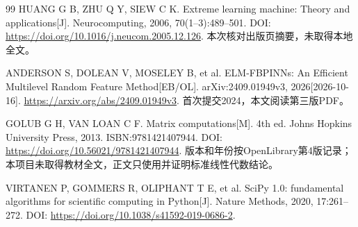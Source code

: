 \begin{thebibliography}{99}
 HUANG G B, ZHU Q Y, SIEW C K. Extreme learning machine: Theory and applications[J]. Neurocomputing, 2006, 70(1--3):489--501. DOI: \url{https://doi.org/10.1016/j.neucom.2005.12.126}. 本次核对出版页摘要，未取得本地全文。

 ANDERSON S, DOLEAN V, MOSELEY B, et al. ELM-FBPINNs: An Efficient Multilevel Random Feature Method[EB/OL]. arXiv:2409.01949v3, 2026[2026-10-16]. \url{https://arxiv.org/abs/2409.01949v3}. 首次提交2024，本文阅读第三版PDF。

 GOLUB G H, VAN LOAN C F. Matrix computations[M]. 4th ed. Johns Hopkins University Press, 2013. ISBN:9781421407944. DOI: \url{https://doi.org/10.56021/9781421407944}. 版本和年份按OpenLibrary第4版记录；本项目未取得教材全文，正文只使用并证明标准线性代数结论。

 VIRTANEN P, GOMMERS R, OLIPHANT T E, et al. SciPy 1.0: fundamental algorithms for scientific computing in Python[J]. Nature Methods, 2020, 17:261--272. DOI: \url{https://doi.org/10.1038/s41592-019-0686-2}.
\end{thebibliography}
